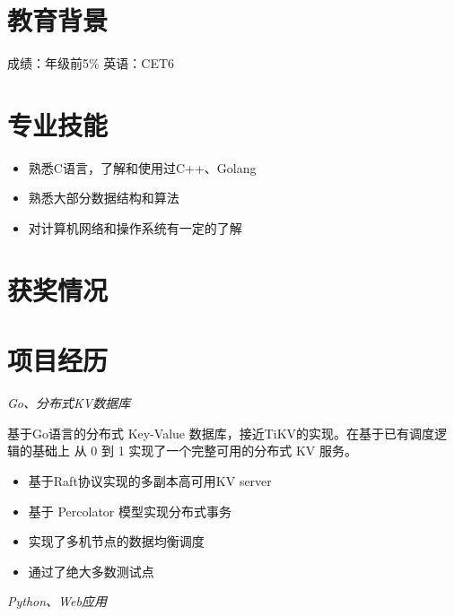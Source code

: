 \documentclass{uniquecv}
\begin{document}

\medskip




\section{教育背景}
成绩：年级前5\% \quad 英语：CET6



\section{专业技能}
\smallskip
\begin{itemize}
\item 熟悉C语言，了解和使用过C++、Golang
\item 熟悉大部分数据结构和算法
\item 对计算机网络和操作系统有一定的了解
\end{itemize}


\section{获奖情况}
\medskip


\section{项目经历}

\textit{Go、分布式KV数据库}
\vspace{0.4ex}


基于Go语言的分布式 Key-Value 数据库，接近TiKV的实现。在基于已有调度逻辑的基础上
从 0 到 1 实现了一个完整可用的分布式 KV 服务。
\begin{itemize}
  \item 基于Raft协议实现的多副本高可用KV server
  \item 基于 Percolator 模型实现分布式事务
  \item 实现了多机节点的数据均衡调度
  \item 通过了绝大多数测试点
\end{itemize}
\textit{Python、Web应用}
\vspace{0.4ex}
\end{document}
